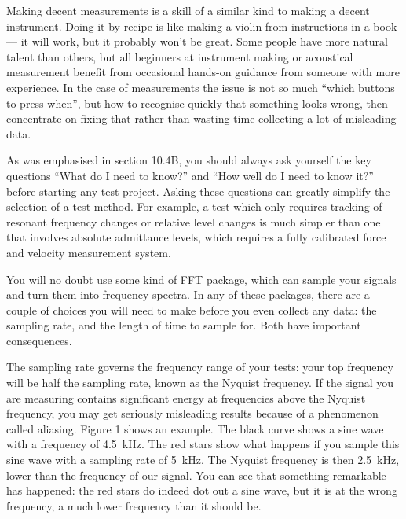 
  Making decent measurements is a skill of a similar kind to making a decent 
  instrument. Doing it by recipe is like making a violin from instructions in a 
  book — it will work, but it probably won’t be great. Some people have more 
  natural talent than others, but all beginners at instrument making or 
  acoustical measurement benefit from occasional hands-on guidance from someone 
  with more experience. In the case of measurements the issue is not so much 
  “which buttons to press when”, but how to recognise quickly that something 
  looks wrong, then concentrate on fixing that rather than wasting time 
  collecting a lot of misleading data. 

  As was emphasised in section 10.4B, you should always ask yourself the key 
  questions “What do I need to know?” and “How well do I need to know it?” 
  before starting any test project. Asking these questions can greatly simplify 
  the selection of a test method. For example, a test which only requires 
  tracking of resonant frequency changes or relative level changes is much 
  simpler than one that involves absolute admittance levels, which requires a 
  fully calibrated force and velocity measurement system. 


  You will no doubt use some kind of FFT package, which can sample your signals 
  and turn them into frequency spectra. In any of these packages, there are a 
  couple of choices you will need to make before you even collect any data: the 
  sampling rate, and the length of time to sample for. Both have important 
  consequences. 

  The sampling rate governs the frequency range of your tests: your top 
  frequency will be half the sampling rate, known as the Nyquist frequency. If 
  the signal you are measuring contains significant energy at frequencies above 
  the Nyquist frequency, you may get seriously misleading results because of a 
  phenomenon called aliasing. Figure 1 shows an example. The black curve shows 
  a sine wave with a frequency of 4.5~kHz. The red stars show what happens if 
  you sample this sine wave with a sampling rate of 5~kHz. The Nyquist 
  frequency is then 2.5~kHz, lower than the frequency of our signal. You can 
  see that something remarkable has happened: the red stars do indeed dot out a 
  sine wave, but it is at the wrong frequency, a much lower frequency than it 
  should be. 


